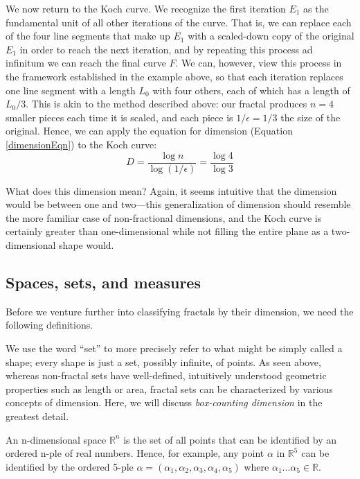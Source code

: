 We now return to the Koch curve. We recognize the first iteration $E_1$ as the fundamental unit of all other iterations of the curve. That is, we can replace each of the four line segments that make up $E_1$ with a scaled-down copy of the original $E_1$ in order to reach the next iteration, and by repeating this process ad infinitum we can reach the final curve $F$. We can, however, view this process in the framework established in the example above, so that each iteration replaces one line segment with a length $L_0$ with four others, each of which has a length of $L_0/3$. This is akin to the method described above: our fractal produces $n = 4$ smaller pieces each time it is scaled, and each piece is $1/\epsilon = 1/3$ the size of the original. Hence, we can apply the equation for dimension (Equation \ref{dimensionEqn}) to the Koch curve:
\begin{equation}
D = \frac{\log{n}}{\log{(1/\epsilon)}} = \frac{\log{4}}{\log{3}} 
\end{equation}

\begin{myremark}What does this dimension mean? Again, it seems intuitive that the dimension would be between one and two---this generalization of dimension should resemble the more familiar case of non-fractional dimensions, and the Koch curve is certainly greater than one-dimensional while not filling the entire plane as a two-dimensional shape would. \end{myremark}



\subsection{Spaces, sets, and measures}
Before we venture further into classifying fractals by their dimension, we need the following definitions.

We use the word ``set'' to more precisely refer to what might be simply called a shape; every shape is just a set, possibly infinite, of points. As seen above, whereas non-fractal sets have well-defined, intuitively understood geometric properties such as length or area, fractal sets can be characterized by various concepts of dimension. Here, we will discuss \textit{box-counting dimension} in the greatest detail.

\begin{mydef}
An n-dimensional space $ \mathbb{R}^{n} $ is the set of all points that can be identified by an ordered n-ple of real numbers. Hence, for example, any point $ \alpha $ in $ \mathbb{R}^{5} $ can be identified by the ordered 5-ple $ \alpha = (\alpha_{1}, \alpha_{2}, \alpha_{3}, \alpha_{4}, \alpha_{5})$ where $ \alpha_{1} ... \alpha_{5} \in \mathbb{R} $.\end{mydef}

